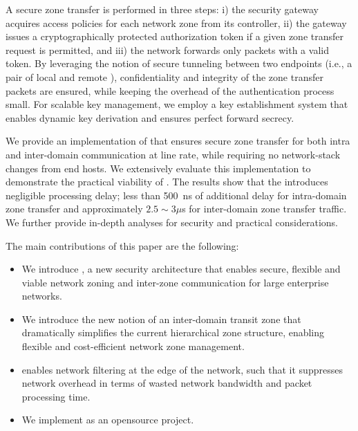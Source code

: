 
A secure zone transfer is performed in three steps: i) the security gateway acquires
access policies for each network zone from its controller, ii) the gateway issues a
cryptographically protected authorization token if a given zone transfer request is 
permitted, and iii) the network forwards only packets with a valid token. By leveraging 
the notion of secure tunneling between two endpoints (i.e., a pair of local and remote \tps), 
confidentiality and integrity of the zone transfer packets are ensured, while keeping the overhead of the authentication process small. For scalable key management, 
we employ a key establishment system that enables dynamic key derivation 
and ensures perfect forward secrecy.

We provide an implementation of \name that ensures secure zone transfer for
both intra and inter-domain communication at line rate, while requiring no network-stack 
changes from end hosts. We extensively evaluate this implementation to demonstrate
the practical viability of \name. The results show that the \tp introduces negligible 
processing delay; less than \SI{500}{ns} of additional delay for intra-domain zone transfer
and approximately $2.5 \sim 3 \mu$s for inter-domain zone transfer traffic. We further 
provide in-depth analyses for security and practical considerations.

The main contributions of this paper are the following:

\begin{itemize}
	\item We introduce \name, a new security architecture that enables secure, flexible 
	and viable network zoning and inter-zone communication for large enterprise 
	networks.
	\item We introduce the new notion of an inter-domain transit zone that dramatically 
	simplifies the current hierarchical zone structure, enabling flexible and cost-efficient 
	network zone management. 
	\item \name enables network filtering at the edge of the network, such that it suppresses
	network overhead in terms of wasted network bandwidth and packet processing time.
	\item We implement \name as an opensource project. %
\end{itemize}

